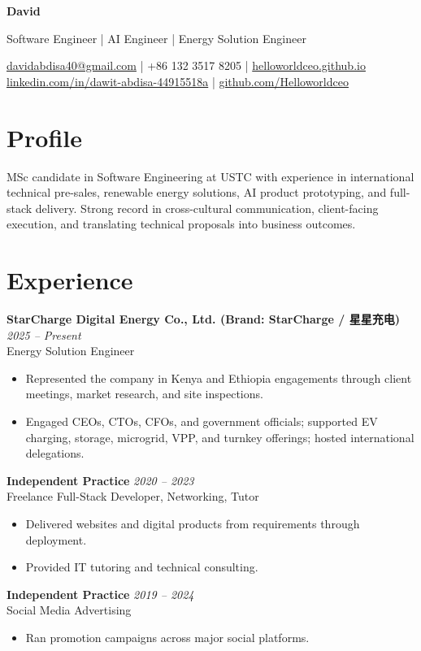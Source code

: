 \documentclass[9pt,a4paper]{article}
\newcommand{\cvname}[1]{{\LARGE\bfseries #1}}
\newcommand{\cvsubtitle}[1]{{\normalsize\color{textgray}#1}}
\newcommand{\entry}[3]{\textbf{#1} \hfill \textit{#2}\\#3\vspace{0.1em}}
\begin{document}
\cvname{David}

\cvsubtitle{Software Engineer | AI Engineer | Energy Solution Engineer}

\href{mailto:davidabdisa40@gmail.com}{davidabdisa40@gmail.com} \;|\; +86 132 3517 8205 \;|\;
\href{https://helloworldceo.github.io}{helloworldceo.github.io}\\
\href{https://linkedin.com/in/dawit-abdisa-44915518a}{linkedin.com/in/dawit-abdisa-44915518a} \;|\;
\href{https://github.com/Helloworldceo}{github.com/Helloworldceo}

\section*{Profile}
MSc candidate in Software Engineering at USTC with experience in international technical pre-sales, renewable energy solutions, AI product prototyping, and full-stack delivery. Strong record in cross-cultural communication, client-facing execution, and translating technical proposals into business outcomes.

\section*{Experience}
\entry{StarCharge Digital Energy Co., Ltd. (Brand: StarCharge / 星星充电)}{2025 -- Present}{Energy Solution Engineer}
\begin{itemize}
  \item Represented the company in Kenya and Ethiopia engagements through client meetings, market research, and site inspections.
  \item Engaged CEOs, CTOs, CFOs, and government officials; supported EV charging, storage, microgrid, VPP, and turnkey offerings; hosted international delegations.
\end{itemize}

\entry{Independent Practice}{2020 -- 2023}{Freelance Full-Stack Developer, Networking, Tutor}
\begin{itemize}
  \item Delivered websites and digital products from requirements through deployment.
  \item Provided IT tutoring and technical consulting.
\end{itemize}

\entry{Independent Practice}{2019 -- 2024}{Social Media Advertising}
\begin{itemize}
  \item Ran promotion campaigns across major social platforms.
\end{itemize}
\end{document}
